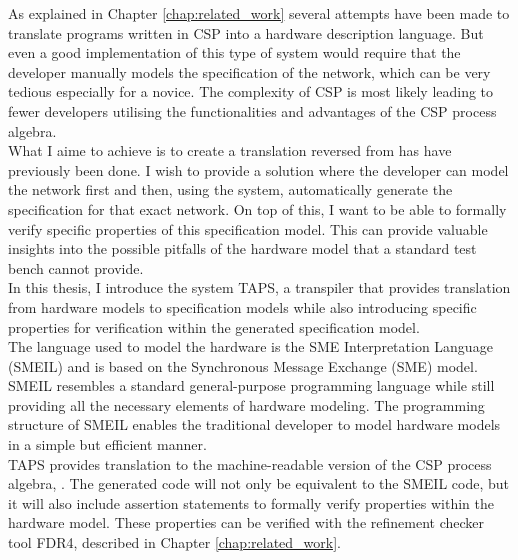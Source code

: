 %



As explained in Chapter \ref{chap:related_work} several attempts have been made to translate programs written in CSP into a hardware description language. But even a good implementation of this type of system would require that the developer manually models the specification of the \cspm{} network, which can be very tedious especially for a novice.
The complexity of CSP is most likely leading to fewer developers utilising the functionalities and advantages of the CSP process algebra.\\

What I aime to achieve is to create a translation reversed from has have previously been done. I wish to provide a solution where the developer can model the network first and then, using the system, automatically generate the specification for that exact network. On top of this, I want to be able to formally verify specific properties of this specification model. This can provide valuable insights into the possible pitfalls of the hardware model that a standard test bench cannot provide.\\

In this thesis, I introduce the system TAPS, a transpiler that provides translation from hardware models to specification models while also introducing specific properties for verification within the generated specification model.\\

The language used to model the hardware is the SME Interpretation Language (SMEIL) and is based on the Synchronous Message Exchange (SME) model. SMEIL resembles a standard general-purpose programming language while still providing all the necessary elements of hardware modeling. The programming structure of SMEIL enables the traditional developer to model hardware models in a simple but efficient manner.\\

TAPS provides translation to the machine-readable version of the CSP process algebra, \cspm{}. The generated \cspm{} code will not only be equivalent to the SMEIL code, but it will also include assertion statements to formally verify properties within the hardware model. These properties can be verified with the \cspm{} refinement checker tool FDR4, described in Chapter \ref{chap:related_work}.


